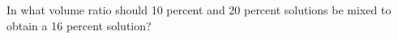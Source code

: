 In what volume ratio should 10 percent and 20 percent solutions be mixed to obtain a 16 percent solution?
